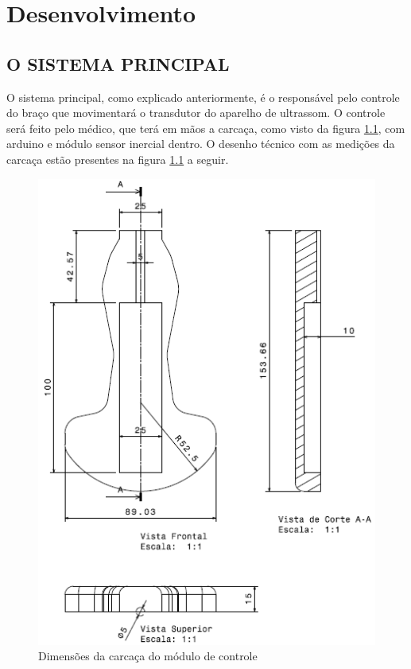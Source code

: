 \chapter{Desenvolvimento}

\section{O SISTEMA PRINCIPAL}

O sistema principal, como explicado anteriormente, é o responsável pelo controle do braço que movimentará o transdutor do aparelho de ultrassom. O controle será feito pelo médico, que terá em mãos a carcaça, como visto da figura \ref{des_fig1}, com arduino e módulo sensor inercial dentro. O desenho técnico com as medições da carcaça estão presentes na figura \ref{des_fig1} a seguir.

\begin{figure}[H]
	\centering	\includegraphics[keepaspectratio=true,scale=1]{figuras/medicas_controle.png}
	\caption{Dimensões da carcaça do módulo de controle}
	\label{des_fig1}
\end{figure}


